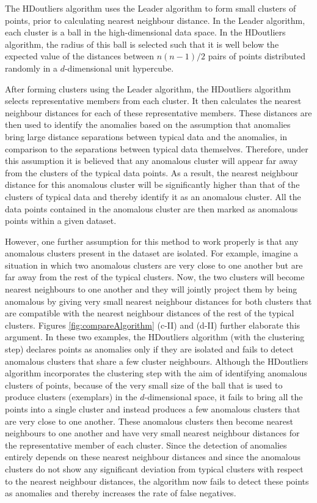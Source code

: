 \documentclass[11pt,a4paper,]{article}
\theoremstyle{definition}
\theoremstyle{definition}
\theoremstyle{definition}
\theoremstyle{remark}
\begin{document}
The HDoutliers algorithm uses the Leader algorithm \autocite{hartigan1975clustering} to form small clusters of points, prior to calculating nearest neighbour distance. In the Leader algorithm, each cluster is a ball in the high-dimensional data space. In the HDoutliers algorithm, the radius of this ball is selected such that it is well below the expected value of the distances between \(n(n-1)/2\) pairs of points distributed randomly in a \(d\)-dimensional unit hypercube.

After forming clusters using the Leader algorithm, the HDoutliers algorithm selects representative members from each cluster. It then calculates the nearest neighbour distances for each of these representative members. These distances are then used to identify the anomalies based on the assumption that anomalies bring large distance separations between typical data and the anomalies, in comparison to the separations between typical data themselves. Therefore, under this assumption it is believed that any anomalous cluster will appear far away from the clusters of the typical data points. As a result, the nearest neighbour distance for this anomalous cluster will be significantly higher than that of the clusters of typical data and thereby identify it as an anomalous cluster. All the data points contained in the anomalous cluster are then marked as anomalous points within a given dataset.

However, one further assumption for this method to work properly is that any anomalous clusters present in the dataset are isolated. For example, imagine a situation in which two anomalous clusters are very close to one another but are far away from the rest of the typical clusters. Now, the two clusters will become nearest neighbours to one another and they will jointly project them by being anomalous by giving very small nearest neighbour distances for both clusters that are compatible with the nearest neighbour distances of the rest of the typical clusters. Figures \ref{fig:compareAlgorithm} (c-II) and (d-II) further elaborate this argument. In these two examples, the HDoutliers algorithm (with the clustering step) declares points as anomalies only if they are isolated and fails to detect anomalous clusters that share a few cluster neighbours. Although the HDoutliers algorithm incorporates the clustering step with the aim of identifying anomalous clusters of points, because of the very small size of the ball that is used to produce clusters (exemplars) in the \(d\)-dimensional space, it fails to bring all the points into a single cluster and instead produces a few anomalous clusters that are very close to one another. These anomalous clusters then become nearest neighbours to one another and have very small nearest neighbour distances for the representative member of each cluster. Since the detection of anomalies entirely depends on these nearest neighbour distances and since the anomalous clusters do not show any significant deviation from typical clusters with respect to the nearest neighbour distances, the algorithm now fails to detect these points as anomalies and thereby increases the rate of false negatives.
\end{document}
